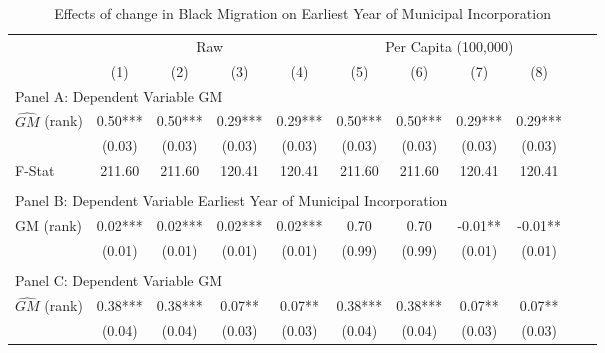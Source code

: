  \begin{table}[htbp]\centering {} \begin{threeparttable} \caption{Effects of change in Black Migration on Earliest Year of Municipal Incorporation} \begin{tabular}{l*{10}{c}} \toprule
                &\multicolumn{4}{c}{Raw}                                    &\multicolumn{4}{c}{Per Capita (100,000)}                   \\\cmidrule(lr){2-5}\cmidrule(lr){6-9}
                &\multicolumn{1}{c}{(1)}   &\multicolumn{1}{c}{(2)}   &\multicolumn{1}{c}{(3)}   &\multicolumn{1}{c}{(4)}   &\multicolumn{1}{c}{(5)}   &\multicolumn{1}{c}{(6)}   &\multicolumn{1}{c}{(7)}   &\multicolumn{1}{c}{(8)}   \\
\cmidrule(lr){1-9}
\multicolumn{8}{l}{Panel A: Dependent Variable GM}\\
\cmidrule(lr){1-9}
$\hat{GM}$ (rank)&       0.50***&       0.50***&       0.29***&       0.29***&       0.50***&       0.50***&       0.29***&       0.29***\\
                &     (0.03)   &     (0.03)   &     (0.03)   &     (0.03)   &     (0.03)   &     (0.03)   &     (0.03)   &     (0.03)   \\
\midrule
F-Stat          &     211.60   &     211.60   &     120.41   &     120.41   &     211.60   &     211.60   &     120.41   &     120.41   \\
\cmidrule[\heavyrulewidth](lr){1-9} \\ \cmidrule[\heavyrulewidth](lr){1-9}
\multicolumn{8}{l}{Panel B: Dependent Variable Earliest Year of Municipal Incorporation}\\
\cmidrule(lr){1-9}
GM  (rank)      &       0.02***&       0.02***&       0.02***&       0.02***&       0.70   &       0.70   &      -0.01** &      -0.01** \\
                &     (0.01)   &     (0.01)   &     (0.01)   &     (0.01)   &     (0.99)   &     (0.99)   &     (0.01)   &     (0.01)   \\
\cmidrule[\heavyrulewidth](lr){1-9} \\ \cmidrule[\heavyrulewidth](lr){1-9}
\multicolumn{8}{l}{Panel C: Dependent Variable GM}\\
\cmidrule(lr){1-9}
$\hat{GM}$ (rank)&       0.38***&       0.38***&       0.07** &       0.07** &       0.38***&       0.38***&       0.07** &       0.07** \\
                &     (0.04)   &     (0.04)   &     (0.03)   &     (0.03)   &     (0.04)   &     (0.04)   &     (0.03)   &     (0.03)   \\

\end{tabular}
\end{threeparttable}
\end{table}
